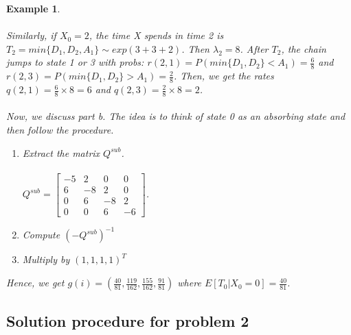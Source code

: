 \documentclass[12pt]{article}
\newtheorem{example}{Example}
\begin{document}
\begin{example}
    \\
    \\Similarly, if $X_0 = 2$, the time X spends in time 2 is $T_2=min\{D_1,D_2,A_1\} \sim exp(3+3+2)$. Then $\lambda_2 = 8$. After $T_2$, the chain jumps to state 1 or 3 with probs: $r(2,1) = P(min\{D_1,D_2\}<A_1) = \frac{6}{8}$ and $r(2,3) = P(min\{D_1,D_2\}>A_1) = \frac{2}{8}$. Then, we get the rates $q(2,1) = \frac{6}{8}\times8=6$ and $q(2,3) = \frac{2}{8}\times8=2$.
    \\
    \\Now, we discuss part b. The idea is to think of state 0 as an absorbing state and then follow the procedure.
    \begin{enumerate}
        \item Extract the matrix $Q^{sub}$.\\
        \\$Q^{sub} = \begin{bmatrix}
         -5 & 2 & 0 & 0\\
         6 & -8 & 2 & 0\\
         0 & 6 & -8 & 2\\
         0 & 0 & 6 & -6
        \end{bmatrix}$.
        \item Compute $(-Q^{sub})^{-1}$
        \item Multiply by $(1,1,1,1)^T$
    \end{enumerate}
    Hence, we get $g(i) = (\frac{40}{81}, \frac{119}{162}, \frac{155}{162},  \frac{91}{81})$ where $E[T_0|X_0=0] = \frac{40}{81}$.
\end{example}

\subsection{Solution procedure for problem 2}
\end{document}
